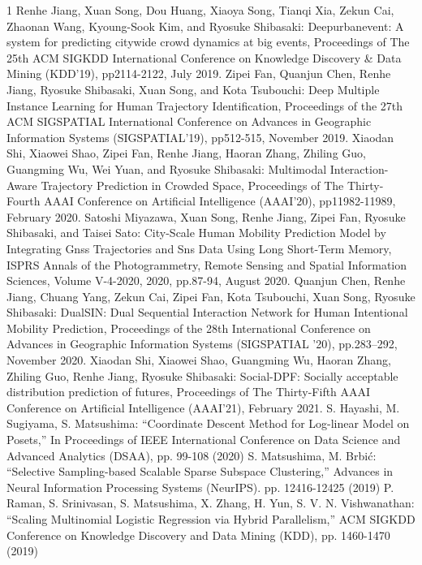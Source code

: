 \begin{査読付}{1}
Renhe Jiang, Xuan Song, Dou Huang, Xiaoya Song, Tianqi Xia, Zekun Cai, Zhaonan Wang, Kyoung-Sook Kim, and Ryosuke Shibasaki:
Deepurbanevent: A system for predicting citywide crowd dynamics at big events, Proceedings of The 25th ACM SIGKDD International Conference on Knowledge Discovery \& Data Mining (KDD'19), pp2114-2122, July 2019.
Zipei Fan, Quanjun Chen, Renhe Jiang, Ryosuke Shibasaki, Xuan Song, and Kota Tsubouchi:
Deep Multiple Instance Learning for Human Trajectory Identification, Proceedings of the 27th ACM SIGSPATIAL International Conference on Advances in Geographic Information Systems (SIGSPATIAL'19), pp512-515, November 2019.
Xiaodan Shi, Xiaowei Shao, Zipei Fan, Renhe Jiang, Haoran Zhang, Zhiling Guo, Guangming Wu, Wei Yuan, and Ryosuke Shibasaki:
Multimodal Interaction-Aware Trajectory Prediction in Crowded Space, Proceedings of The Thirty-Fourth AAAI Conference on Artificial Intelligence (AAAI'20), pp11982-11989, February 2020.
Satoshi Miyazawa, Xuan Song, Renhe Jiang, Zipei Fan, Ryosuke Shibasaki, and Taisei Sato:
City-Scale Human Mobility Prediction Model by Integrating Gnss Trajectories and Sns Data Using Long Short-Term Memory, ISPRS Annals of the Photogrammetry, Remote Sensing and Spatial Information Sciences, Volume V-4-2020, 2020, pp.87-94, August 2020.
Quanjun Chen, Renhe Jiang, Chuang Yang, Zekun Cai, Zipei Fan, Kota Tsubouchi, Xuan Song, Ryosuke Shibasaki: 
DualSIN: Dual Sequential Interaction Network for Human Intentional Mobility Prediction, Proceedings of the 28th International Conference on Advances in Geographic Information Systems (SIGSPATIAL '20), pp.283–292, November 2020.
Xiaodan Shi, Xiaowei Shao, Guangming Wu, Haoran Zhang, Zhiling Guo, Renhe Jiang, Ryosuke Shibasaki: 
Social-DPF: Socially acceptable distribution prediction of futures, Proceedings of The Thirty-Fifth AAAI Conference on Artificial Intelligence (AAAI'21), February 2021.
S. Hayashi, M. Sugiyama, S. Matsushima: “Coordinate Descent Method for Log-linear Model on Posets,”  In Proceedings of IEEE International Conference on Data Science and Advanced Analytics (DSAA), pp. 99-108 (2020)
S. Matsushima, M. Brbić: “Selective Sampling-based Scalable Sparse Subspace Clustering,” Advances in Neural Information Processing Systems (NeurIPS). pp. 12416-12425 (2019)
P. Raman, S. Srinivasan, S. Matsushima, X. Zhang, H. Yun, S. V. N. Vishwanathan: “Scaling Multinomial Logistic Regression via Hybrid Parallelism,” ACM SIGKDD Conference on Knowledge Discovery and Data Mining (KDD), pp. 1460-1470 (2019)


\end{査読付}
